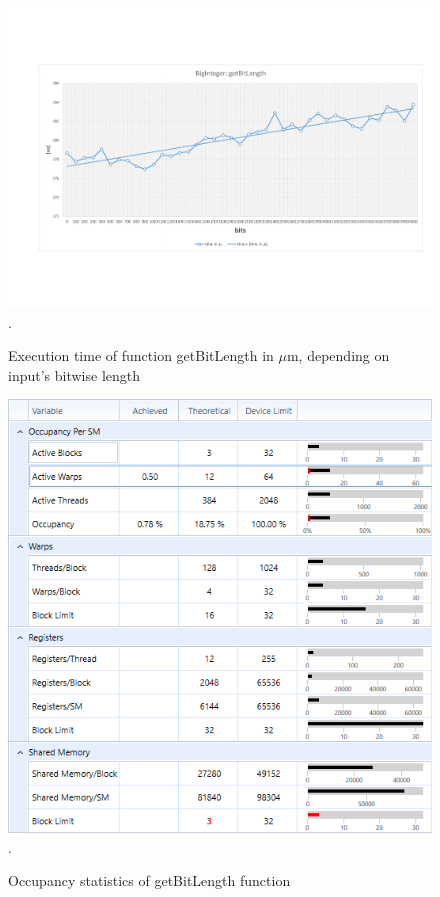 \documentclass[oneside,openright,12pt,final,en]{mgr}
\begin{document}
\begin{figure}[H]
	\centering
	\includegraphics[width=\textwidth,trim={0.5cm 2.8cm 0.4cm 2.8cm},clip]{bitlength.pdf}.
	\caption{Execution time of function getBitLength in $\mu$m, depending on input's bitwise length}
	\label{fig:bitlength}
\end{figure}

\begin{figure}[H]
	\centering
	\includegraphics[width=\textwidth]{bitlength_occupancy}.
	\caption{Occupancy statistics of getBitLength function}
	\label{fig:bitlength_occupancy}
\end{figure}
\end{document}
